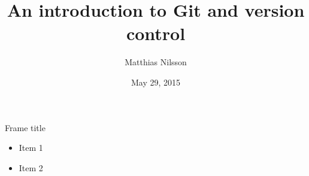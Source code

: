 \documentclass{beamer}
\title{An introduction to Git and version control}
\author{Matthias Nilsson}
\institute{Chalmers University of Technology}
\date{May 29, 2015}
\begin{document}
{
\begin{frame}
\maketitle
\end{frame}
}

\begin{frame}{Frame title}
  \begin{itemize}
  \item Item 1
  \item Item 2
  \end{itemize}
\end{frame}
\end{document}
